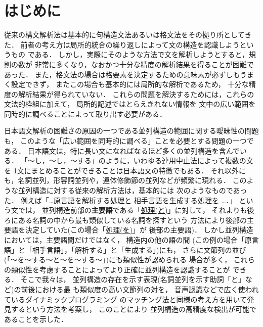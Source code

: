 

\maketitle

\section{はじめに}

従来の構文解析法は基本的に句構造文法あるいは格文法をその拠り所としてきた．
前者の考え方は局所的統合の繰り返しによって文の構造を認識しようというもの
である．
しかし，実際にそのような方法で文を解析しようとすると，規則の数が
非常に多くなり，なおかつ十分な精度の解析結果を得ることが困難であった．
また，格文法の場合は格要素を決定するための意味素が必ずしもうまく設定できず，
またこの場合も基本的には局所的な解析であるため，
十分な精度の解析結果が得られていない．
これらの問題を解決するためには，これらの文法的枠組に加えて，
局所的記述ではとらえきれない情報を
文中の広い範囲を同時的に調べることによって取り出す必要がある．

日本語文解析の困難さの原因の一つである並列構造の範囲に関する曖昧性の問題も，
このような「広い範囲を同時的に調べる」ことを必要とする問題の一つである．
日本語文は，特に長い文になればなるほど多くの並列構造を含んでいる．
「〜し，〜し，〜する」のように，いわゆる連用中止法によって複数の文を
1文にまとめることができることは日本語文の特徴でもある．
それ以外にも，名詞並列，形容詞並列や，連体修飾節の並列などが頻繁に現れる．
このような並列構造に対する従来の解析方法は，基本的には
次のようなものであった\cite{Nagao1983,Agarwal1992}．
例えば「\ldots 原言語を解析する\underline{処理と}
相手言語を生成する\underline{処理を} \ldots ．」
という文では，
並列構造前部の{\bf 主要語}である「\underline{処理(と)}」に対して，
それよりも後ろにある名詞の中から最も類似している名詞を探すという
方法により後部の主要語を決定していた(この場合「\underline{処理(を)}」が
後部の主要語)．
しかし並列構造においては，主要語間だけではなく，
構造内の他の語の間
(この例の場合「原言語」と「相手言語」，「解析する」と「生成する」)にも，
さらに文節列の並び(「〜を〜する〜と〜を〜する〜」)にも類似性が認められる
場合が多く，
これらの類似性を考慮することによってより正確に並列構造を認識することが
できる．
そこで我々は，
並列構造の存在を示す表現(名詞並列を示す助詞「と」など)の前後における最
も類似度の高い文節列の対を，
音声認識などで広く使われているダイナミックプログラミング
のマッチング法と同様の考え方を用いて発見するという方法を考案し，
このことにより
並列構造の高精度な検出が可能であることを示した\cite{KurohashiAndNagao1992}．


